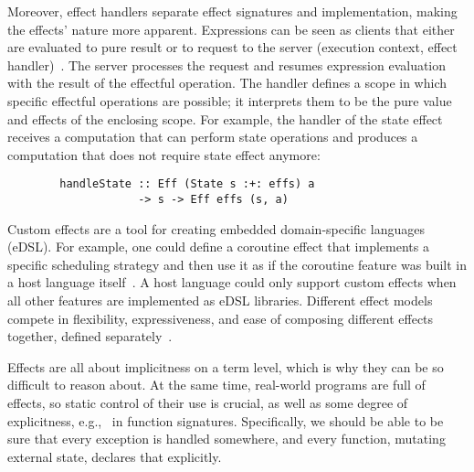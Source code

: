 \documentclass[conference]{IEEEtran}
\begin{document}
    Moreover, effect handlers separate effect signatures and implementation, making the effects' nature more apparent.
    Expressions can be seen as clients that either are evaluated to pure result or to request to the server (execution context, effect handler)~\cite{kiselyov2013extensible}.
    The server processes the request and resumes expression evaluation with the result of the effectful operation.
    The handler defines a scope in which specific effectful operations are possible; it interprets them to be the pure value and effects of the enclosing scope.
    For example, the handler of the state effect receives a computation that can perform state operations and produces a computation that does not require state effect anymore:
    \begin{verbatim}
        handleState :: Eff (State s :+: effs) a
                    -> s -> Eff effs (s, a)
    \end{verbatim}

    Custom effects are a tool for creating embedded domain-specific languages (eDSL).
    For example, one could define a coroutine effect that implements a specific scheduling strategy and then use it as if the coroutine feature was built in a host language itself~\cite{leijen2017structured}.
    A host language could only support custom effects when all other features are implemented as eDSL libraries.
    Different effect models compete in flexibility, expressiveness, and ease of composing different effects together, defined separately~\cite{liang1995monad, kiselyov2013extensible, schrijvers2019monad, van2024framework}.

    Effects are all about implicitness on a term level, which is why they can be so difficult to reason about.
    At the same time, real-world programs are full of effects, so static control of their use is crucial, as well as some degree of explicitness, e.g., \ in function signatures.
    Specifically, we should be able to be sure that every exception is handled somewhere, and every function, mutating external state, declares that explicitly.
\end{document}
